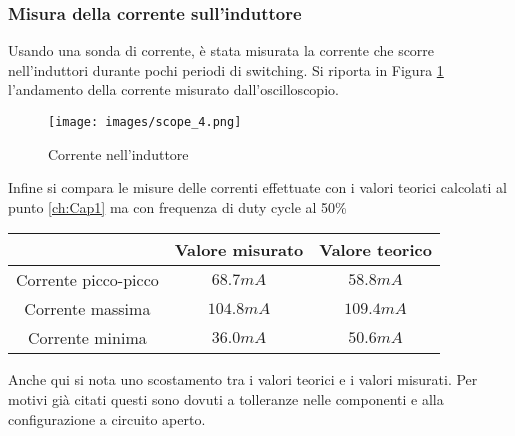 \subsubsection{Misura della corrente sull'induttore}
Usando una sonda di corrente, è stata misurata la corrente che scorre nell'induttori durante pochi periodi di switching. Si riporta in Figura \ref{fig:CurrentInductor1} l'andamento della corrente misurato dall'oscilloscopio.
\begin{figure}[H]
    \centering
    \texttt{[image: images/scope\_4.png]}
    \caption{Corrente nell'induttore}
    \label{fig:CurrentInductor1}
\end{figure}
Infine si compara le misure delle correnti effettuate  con i valori teorici calcolati al punto \ref{ch:Cap1} ma con frequenza di duty cycle al 50\%
\begin{table}[H]
    \centering
    \begin{tabular}{|c|c|c|}
        \hline
        &Valore misurato&Valore teorico\\\hline\hline
        Corrente picco-picco&$68.7mA$&$58.8mA$\\\hline
        Corrente massima&$104.8mA$&$109.4mA$\\\hline
        Corrente minima&$36.0mA$&$50.6mA$\\\hline
    \end{tabular}
\end{table}
Anche qui si nota uno scostamento tra i valori teorici e i valori misurati. Per motivi già citati questi sono dovuti a tolleranze nelle componenti e alla configurazione a circuito aperto.
\clearpage

